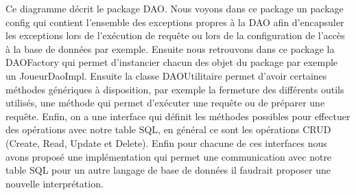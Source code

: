 Ce diagramme décrit le package DAO. Nous voyons dans ce package un package config qui contient l'ensemble des exceptions propres à la DAO afin d'encapsuler les exceptions lors de l'exécution de requête ou lors de la configuration de l'accès à la base de données par exemple. Ensuite nous retrouvons dans ce package la DAOFactory qui permet d'instancier chacun des objet du package par exemple un JoueurDaoImpl. Ensuite la classe DAOUtilitaire permet d'avoir certaines méthodes génériques à disposition, par exemple la fermeture des différents outils utilisés, une méthode qui permet d'exécuter une requête ou de préparer une requête. Enfin, on a une interface qui définit les méthodes possibles pour effectuer des opérations avec notre table SQL, en général ce sont les opérations CRUD (Create, Read, Update et Delete). Enfin pour chacune de ces interfaces nous avons proposé une implémentation qui permet une communication avec notre table SQL pour un autre langage de base de données il faudrait proposer une nouvelle interprétation. 